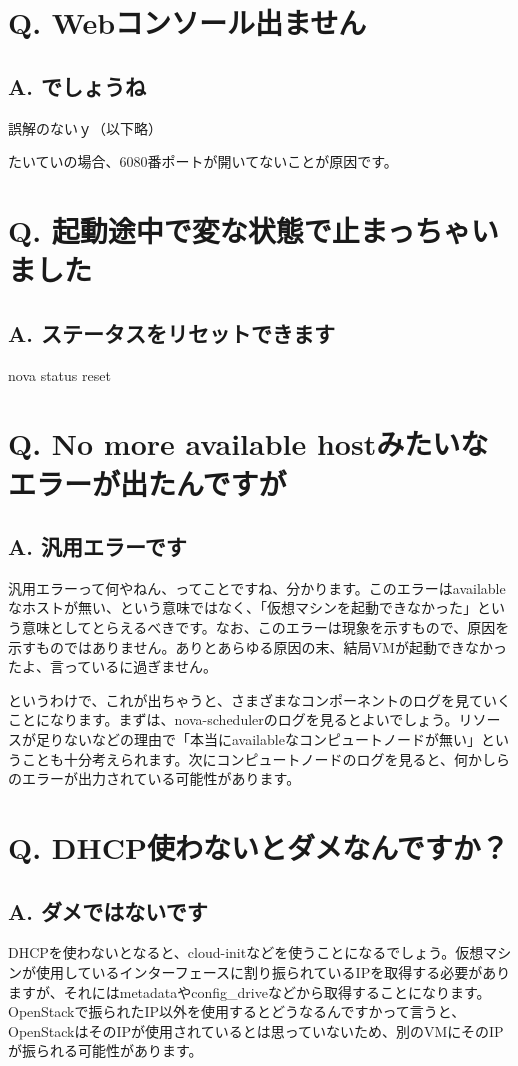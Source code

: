 \documentclass[9pt,b5paper,tombo,openany]{jsbook}
\begin{document}
\section*{Q. Webコンソール出ません}
\subsection*{A. でしょうね}
誤解のないｙ（以下略）

たいていの場合、6080番ポートが開いてないことが原因です。

\section*{Q. 起動途中で変な状態で止まっちゃいました}
\subsection*{A. ステータスをリセットできます}
nova status reset

\section*{Q. No more available hostみたいなエラーが出たんですが}
\subsection*{A. 汎用エラーです}
汎用エラーって何やねん、ってことですね、分かります。このエラーはavailableなホストが無い、という意味ではなく、「仮想マシンを起動できなかった」という意味としてとらえるべきです。なお、このエラーは現象を示すもので、原因を示すものではありません。ありとあらゆる原因の末、結局VMが起動できなかったよ、言っているに過ぎません。

というわけで、これが出ちゃうと、さまざまなコンポーネントのログを見ていくことになります。まずは、nova-schedulerのログを見るとよいでしょう。リソースが足りないなどの理由で「本当にavailableなコンピュートノードが無い」ということも十分考えられます。次にコンピュートノードのログを見ると、何かしらのエラーが出力されている可能性があります。

\section*{Q. DHCP使わないとダメなんですか？}
\subsection*{A. ダメではないです}
DHCPを使わないとなると、cloud-initなどを使うことになるでしょう。仮想マシンが使用しているインターフェースに割り振られているIPを取得する必要がありますが、それにはmetadataやconfig\_driveなどから取得することになります。OpenStackで振られたIP以外を使用するとどうなるんですかって言うと、OpenStackはそのIPが使用されているとは思っていないため、別のVMにそのIPが振られる可能性があります。
\end{document}
